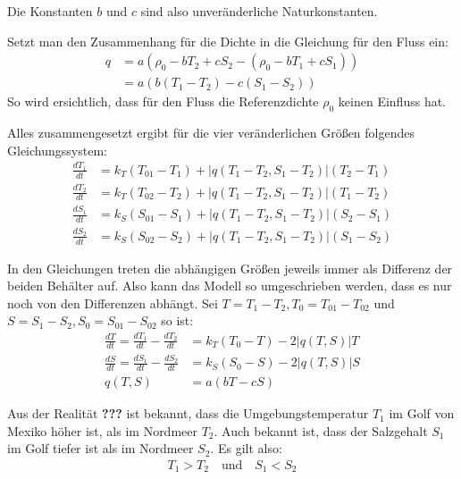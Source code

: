 \documentclass[a4paper,twoside]{article}
\begin{document}
	Die Konstanten \(b\) und \(c\) sind also unveränderliche Naturkonstanten.
	
	Setzt man den Zusammenhang für die Dichte in die Gleichung für den Fluss ein:
	\begin{align*}
		q &= a \left( \rho_0 - bT_2 + cS_2 - \left( \rho_0 - bT_1 + cS_1 \right) \right) \\
		&= a \left( b\left( T_1 - T_2 \right) - c \left( S_1 - S_2 \right) \right)
	\end{align*}
	So wird ersichtlich, dass für den Fluss die Referenzdichte \(\rho_0\) keinen Einfluss hat.
	
	Alles zusammengesetzt ergibt für die vier veränderlichen Größen folgendes Gleichungssystem:
	\begin{align*}
		\frac{dT_1}{dt} &= k_T\left(T_{01} - T_1\right) + \left|q(T_1 - T_2,S_1 - T_2)\right|\left(T_2 - T_1\right) \\
		\frac{dT_2}{dt} &= k_T\left(T_{02} - T_2\right) + \left|q(T_1 - T_2,S_1 - T_2)\right|\left(T_1 - T_2\right) \\
		\frac{dS_1}{dt} &= k_S\left(S_{01} - S_1\right) + \left|q(T_1 - T_2,S_1 - T_2)\right|\left(S_2 - S_1\right) \\
		\frac{dS_2}{dt} &= k_S\left(S_{02} - S_2\right) + \left|q(T_1 - T_2,S_1 - T_2)\right|\left(S_1 - S_2\right)
	\end{align*}
	 
	 In den Gleichungen treten die abhängigen Größen jeweils immer als Differenz der beiden Behälter auf. Also kann das Modell so umgeschrieben werden, dass es nur noch von den Differenzen abhängt. Sei \(T = T_1 - T_2, T_0 = T_{01} - T_{02}\) und \(S = S_1 - S_2, S_0 = S_{01} - S_{02}\)  so ist:
	 \begin{align*}
	 	\frac{dT}{dt} = \frac{dT_1}{dt} - \frac{dT_2}{dt} &= k_T\left(T_{0} - T\right) - 2\left|q(T,S)\right|T \\
	 	\frac{dS}{dt} = \frac{dS_1}{dt} - \frac{dS_2}{dt} &= k_S\left(S_{0} - S\right) - 2\left|q(T,S)\right|S \\
	 	q(T,S) &= a\left(bT - cS\right)
	 \end{align*}
	  
	Aus der Realität \textbf{???} ist bekannt, dass die Umgebungstemperatur \(T_1\) im Golf von Mexiko höher ist, als im Nordmeer \(T_2\). Auch bekannt ist, dass der Salzgehalt \(S_1\) im Golf tiefer ist als im Nordmeer \(S_2\). Es gilt also:
	\begin{align*}
		T_1 > T_2 \quad \textrm{und} \quad S_1 < S_2
	\end{align*}
	
\end{document}
